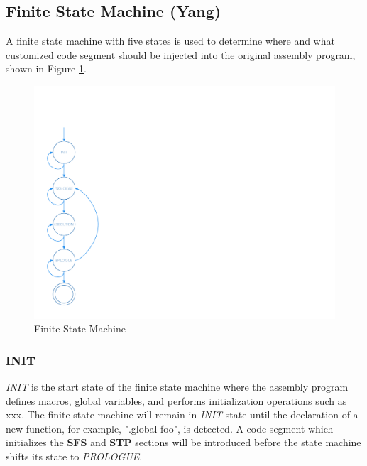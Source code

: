 \subsection{Finite State Machine (Yang)}
A finite state machine with five states is used to determine where and what customized code segment should be injected into the original assembly program, shown in Figure \ref{fig:state_machine}.
\begin{figure}
\centering
\includegraphics[scale=0.45]{figures/state_machine.pdf}
\caption{Finite State Machine}
\label{fig:state_machine}
\end{figure}

\subsubsection{INIT} 
\textit{INIT} is the start state of the finite state machine where the assembly program defines macros, global variables, and performs initialization operations such as xxx. The finite state machine will remain in \textit{INIT} state until the declaration of a new function, for example, ".global foo", is detected. A code segment which initializes the \textbf{SFS} and \textbf{STP} sections will be introduced before the state machine shifts its state to \textit{PROLOGUE}.

